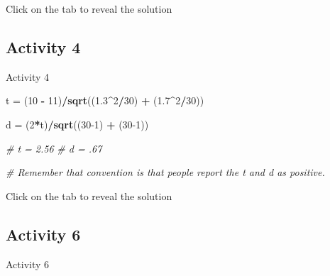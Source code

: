 \documentclass[]{book}
\newenvironment{Shaded}{\begin{snugshade}}{\end{snugshade}}
\newcommand{\CommentTok}[1]{\textcolor[rgb]{0.56,0.35,0.01}{\textit{#1}}}
\newcommand{\DataTypeTok}[1]{\textcolor[rgb]{0.13,0.29,0.53}{#1}}
\newcommand{\DecValTok}[1]{\textcolor[rgb]{0.00,0.00,0.81}{#1}}
\newcommand{\FloatTok}[1]{\textcolor[rgb]{0.00,0.00,0.81}{#1}}
\newcommand{\KeywordTok}[1]{\textcolor[rgb]{0.13,0.29,0.53}{\textbf{#1}}}
\newcommand{\NormalTok}[1]{#1}
\newcommand{\OperatorTok}[1]{\textcolor[rgb]{0.81,0.36,0.00}{\textbf{#1}}}
\newcommand{\StringTok}[1]{\textcolor[rgb]{0.31,0.60,0.02}{#1}}
\begin{document}
Click on the tab to reveal the solution

\hypertarget{activity-4-2}{%
\subsection{Activity 4}\label{activity-4-2}}

Activity 4

\begin{Shaded}
\begin{Highlighting}[]
\NormalTok{t =}\StringTok{ }\NormalTok{(}\DecValTok{10} \OperatorTok{-}\StringTok{ }\DecValTok{11}\NormalTok{)}\OperatorTok{/}\KeywordTok{sqrt}\NormalTok{((}\FloatTok{1.3}\OperatorTok{^}\DecValTok{2}\OperatorTok{/}\DecValTok{30}\NormalTok{) }\OperatorTok{+}\StringTok{ }\NormalTok{(}\FloatTok{1.7}\OperatorTok{^}\DecValTok{2}\OperatorTok{/}\DecValTok{30}\NormalTok{))}

\NormalTok{d =}\StringTok{ }\NormalTok{(}\DecValTok{2}\OperatorTok{*}\NormalTok{t)}\OperatorTok{/}\KeywordTok{sqrt}\NormalTok{((}\DecValTok{30-1}\NormalTok{) }\OperatorTok{+}\StringTok{ }\NormalTok{(}\DecValTok{30-1}\NormalTok{))}

\CommentTok{# t = 2.56}
\CommentTok{# d = .67}

\CommentTok{# Remember that convention is that people report the t and d as positive.}
\end{Highlighting}
\end{Shaded}

Click on the tab to reveal the solution

\hypertarget{activity-6-2}{%
\subsection{Activity 6}\label{activity-6-2}}

Activity 6

\begin{Shaded}
\end{Shaded}
\end{document}
